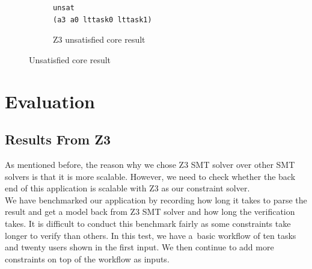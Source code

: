 \documentclass[a4paper]{report}
\begin{document}
\clearpage
\begin{figure}
\begin{subfigure}[H]{\textwidth}
\ContinuedFloat
\begin{lstlisting}[frame=single]
unsat
(a3 a0 lttask0 lttask1)
\end{lstlisting}
\caption{Z3 unsatisfied core result}
\label{fig:Z3 unsatisfied core result}
\end{subfigure}
\caption{Unsatisfied core result}
\label{fig:Unsatisfied core result}
\end{figure}

\chapter{Evaluation}
\section{Results From Z3}
As mentioned before, the reason why we chose Z3 SMT solver over other SMT solvers is that it is more scalable\cite{SMTBenchmark}. However, we need to check whether the back end of this application is scalable with Z3 as our constraint solver. \\

We have benchmarked our application by recording how long it takes to parse the result and get a model back from Z3 SMT solver and how long the verification takes. It is difficult to conduct this benchmark fairly as some constraints take longer to verify than others. In this test, we have a\ basic workflow of ten tasks and twenty users shown in the first input. We then continue to add more constraints on top of the workflow as inputs. \\
\end{document}
